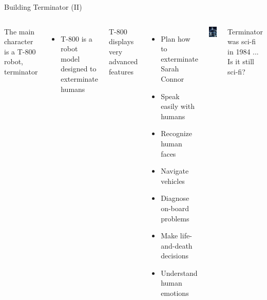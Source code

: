 \documentclass[10pt,compress]{beamer} %
\begin{document}
\begin{frame}{Building Terminator (II)}
	\begin{columns}
			The main character is a T-800 robot, terminator
			\begin{itemize}
			\item T-800 is a robot model designed to exterminate humans
			\end{itemize}
			T-800 displays very advanced features
			\begin{itemize}
            \item Plan how to exterminate Sarah Connor
			\item Speak easily with humans
			\item Recognize human faces
			\item Navigate vehicles
			\item Diagnose on-board problems
			\item Make life-and-death decisions
			\item Understand human emotions
			\end{itemize}
	   	\begin{center}
		\includegraphics[width=0.8\linewidth]{figs/t-800.jpg}
		\end{center}
		\begin{block}{}
			Terminator was sci-fi in 1984 ... Is it still sci-fi?
		\end{block}
	\end{columns}
\end{frame}
\end{document}
